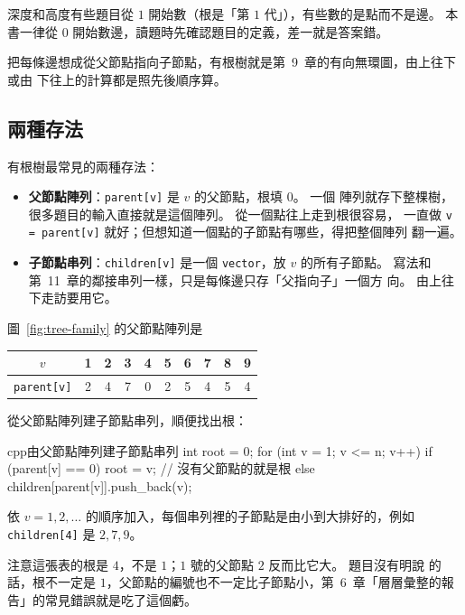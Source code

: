 深度和高度有些題目從 $1$ 開始數（根是「第 $1$ 代」），有些數的是點而不是邊。
本書一律從 $0$ 開始數邊，讀題時先確認題目的定義，差一就是答案錯。

把每條邊想成從父節點指向子節點，有根樹就是第~9~章的有向無環圖，由上往下或由
下往上的計算都是照先後順序算。

\subsection{兩種存法}

有根樹最常見的兩種存法：

\begin{itemize}
\item \textbf{父節點陣列}：\texttt{parent[v]} 是 $v$ 的父節點，根填 $0$。 一個
陣列就存下整棵樹，很多題目的輸入直接就是這個陣列。 從一個點往上走到根很容易，
一直做 \texttt{v = parent[v]} 就好；但想知道一個點的子節點有哪些，得把整個陣列
翻一遍。
\item \textbf{子節點串列}：\texttt{children[v]} 是一個 \texttt{vector}，放 $v$
的所有子節點。 寫法和第~11~章的鄰接串列一樣，只是每條邊只存「父指向子」一個方
向。 由上往下走訪要用它。
\end{itemize}

圖~\ref{fig:tree-family} 的父節點陣列是

\begin{center}
\begin{tabular}{c|ccccccccc}
\toprule
$v$ & 1 & 2 & 3 & 4 & 5 & 6 & 7 & 8 & 9 \\
\midrule
\texttt{parent[v]} & 2 & 4 & 7 & 0 & 2 & 5 & 4 & 5 & 4 \\
\bottomrule
\end{tabular}
\end{center}

從父節點陣列建子節點串列，順便找出根：

\begin{code}{cpp}{由父節點陣列建子節點串列}
int root = 0;
for (int v = 1; v <= n; v++) {
    if (parent[v] == 0) {
        root = v;                       // 沒有父節點的就是根
    } else {
        children[parent[v]].push_back(v);
    }
}
\end{code}

依 $v = 1, 2, \ldots$ 的順序加入，每個串列裡的子節點是由小到大排好的，例如
\texttt{children[4]} 是 $2, 7, 9$。

注意這張表的根是 $4$，不是 $1$；$1$ 號的父節點 $2$ 反而比它大。 題目沒有明說
的話，根不一定是 $1$，父節點的編號也不一定比子節點小，第~6~章「層層彙整的報
告」的常見錯誤就是吃了這個虧。

